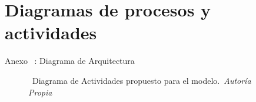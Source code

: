\section{Diagramas de procesos y actividades}

\begin{frame}{Anexo \thesection~: Diagrama de Arquitectura}%
    \vspace{-0.15cm}
    \begin{figure}[H]
        \centering
        \href{run:C:/Users/emicr/Documents/ESCOLARES/ESCOM/TRABAJO TERMINAL/Presentacion/img/Analisis/DiagramaProcesos/DiagramasAnalisis.drawio}{%
        }
        \vspace{-0.25cm}
        \caption{\tiny~Diagrama de Actividades propuesto para el modelo.~\textit{Autoría Propia}}%
        \label{fig:activities_diagram}
    \end{figure}
\end{frame}